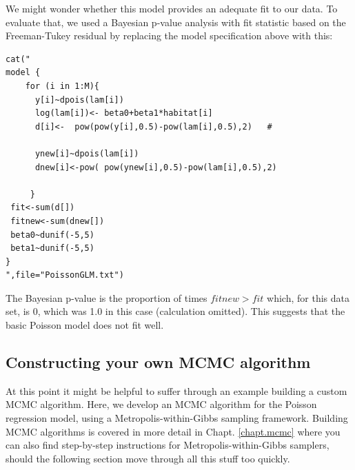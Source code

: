We might wonder whether this model provides an adequate fit to our
data.  To evaluate that, we used a Bayesian p-value analysis with fit
statistic based on the Freeman-Tukey residual by replacing the model
specification above with this:
{\small
\begin{verbatim}
cat("
model {
    for (i in 1:M){
      y[i]~dpois(lam[i])
      log(lam[i])<- beta0+beta1*habitat[i]
      d[i]<-  pow(pow(y[i],0.5)-pow(lam[i],0.5),2)   #

      ynew[i]~dpois(lam[i])
      dnew[i]<-pow( pow(ynew[i],0.5)-pow(lam[i],0.5),2)

     }
 fit<-sum(d[])
 fitnew<-sum(dnew[])
 beta0~dunif(-5,5)
 beta1~dunif(-5,5)
}
",file="PoissonGLM.txt")
\end{verbatim}
}
The Bayesian p-value is the proportion of times $fitnew > fit$ which,
for this data set, is 0, which was 1.0 in this case (calculation
omitted). This suggests that the basic Poisson model does not fit
well.

\subsection{ Constructing your own MCMC algorithm}

At this point it might be helpful to suffer through an example
building a custom MCMC algorithm. Here, we develop an MCMC algorithm
for
the Poisson regression model, using a Metropolis-within-Gibbs sampling framework. Building MCMC algorithms is covered in more detail in Chapt. \ref{chapt.mcmc} where you can also find step-by-step instructions for Metropolis-within-Gibbs samplers, should the following section move through all this stuff too quickly.  

